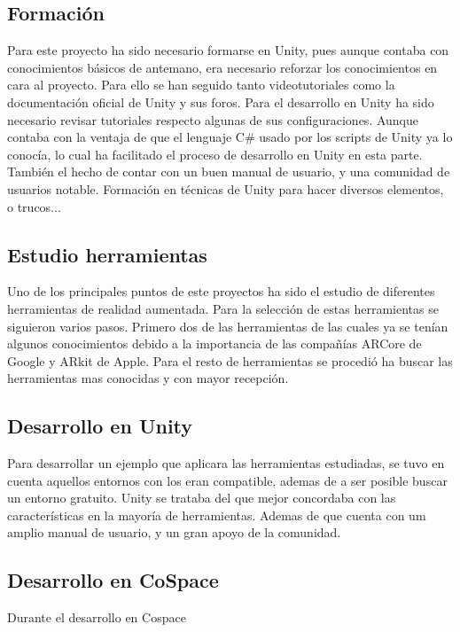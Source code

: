 
\subsection{Formación}
Para este proyecto ha sido necesario formarse en Unity, pues aunque contaba con conocimientos básicos de antemano, era necesario reforzar los conocimientos en cara al proyecto. Para ello se han seguido tanto videotutoriales como la documentación oficial de Unity y sus foros.
Para el desarrollo en Unity ha sido necesario revisar tutoriales respecto algunas de sus configuraciones.
Aunque contaba con la ventaja de que el lenguaje C\# usado por los scripts de Unity ya lo conocía, lo cual ha facilitado el proceso de desarrollo en Unity en esta parte. También el hecho de contar con un buen manual de usuario, y una comunidad de usuarios notable.
Formación en técnicas de Unity para hacer diversos elementos, o trucos...
\subsection{Estudio herramientas}
Uno de los principales puntos de este proyectos ha sido el estudio de diferentes herramientas de realidad aumentada. Para la selección de estas herramientas se siguieron varios pasos. Primero dos de las herramientas de las cuales ya se tenían algunos conocimientos debido a la importancia de las compañías ARCore de Google y ARkit de Apple. Para el resto de herramientas se procedió ha buscar las herramientas mas conocidas y con mayor recepción.
\subsection{Desarrollo en Unity}
Para desarrollar un ejemplo que aplicara las herramientas estudiadas, se tuvo en cuenta aquellos entornos con los eran compatible, ademas de a ser posible buscar un entorno gratuito. Unity se trataba del que mejor concordaba con las características en la mayoría de herramientas. Ademas de que cuenta con um amplio manual de usuario, y un gran apoyo de la comunidad.
\subsection{Desarrollo en CoSpace}
Durante el desarrollo en Cospace




